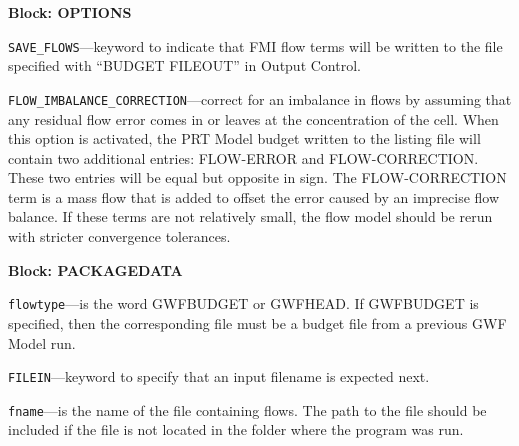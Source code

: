 
\item \textbf{Block: OPTIONS}

\begin{description}
\item \texttt{SAVE\_FLOWS}---keyword to indicate that FMI flow terms will be written to the file specified with ``BUDGET FILEOUT'' in Output Control.

\item \texttt{FLOW\_IMBALANCE\_CORRECTION}---correct for an imbalance in flows by assuming that any residual flow error comes in or leaves at the concentration of the cell.  When this option is activated, the PRT Model budget written to the listing file will contain two additional entries: FLOW-ERROR and FLOW-CORRECTION.  These two entries will be equal but opposite in sign.  The FLOW-CORRECTION term is a mass flow that is added to offset the error caused by an imprecise flow balance.  If these terms are not relatively small, the flow model should be rerun with stricter convergence tolerances.

\end{description}
\item \textbf{Block: PACKAGEDATA}

\begin{description}
\item \texttt{flowtype}---is the word GWFBUDGET or GWFHEAD.  If GWFBUDGET is specified, then the corresponding file must be a budget file from a previous GWF Model run.

\item \texttt{FILEIN}---keyword to specify that an input filename is expected next.

\item \texttt{fname}---is the name of the file containing flows.  The path to the file should be included if the file is not located in the folder where the program was run.

\end{description}

